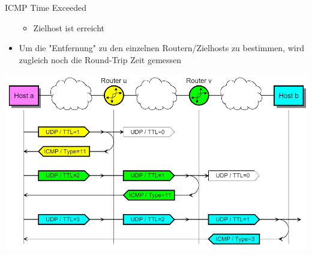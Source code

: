 \begin{definition}{ICMP Time Exceeded}
\begin{itemize}
\begin{itemize}
            \item Zielhost ist erreicht
        \end{itemize}
        \item Um die "Entfernung" zu den einzelnen Routern/Zielhosts zu bestimmen, wird zugleich noch die Round-Trip Zeit gemessen
    \end{itemize}
        \includegraphics[width=1\linewidth]{images/traceroute.png}
\end{definition}